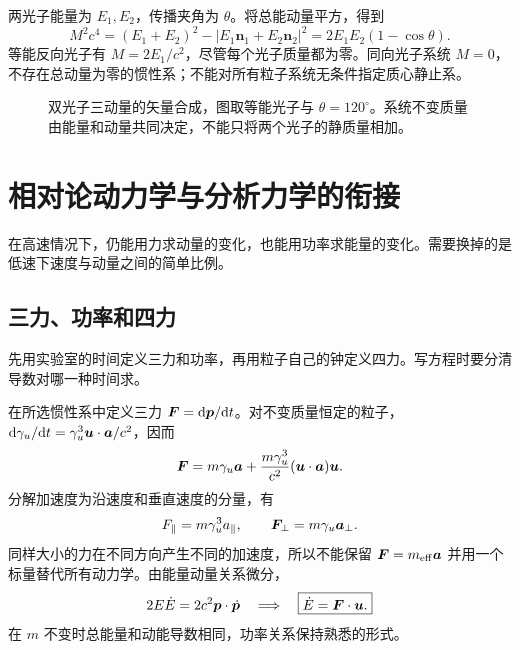 \begin{example}[两个无质量粒子组成有质量系统]
两光子能量为 $E_1,E_2$，传播夹角为 $\theta$。将总能动量平方，得到
\[
M^2c^4=(E_1+E_2)^2-|E_1\boldsymbol{n}_1+E_2\boldsymbol{n}_2|^2
=2E_1E_2(1-\cos\theta).
\]
等能反向光子有 $M=2E_1/c^2$，尽管每个光子质量都为零。同向光子系统 $M=0$，不存在总动量为零的惯性系；不能对所有粒子系统无条件指定质心静止系。
\end{example}

\begin{figure}[htbp]\centering
{}
\caption{双光子三动量的矢量合成，图取等能光子与 $\theta=120^\circ$。系统不变质量由能量和动量共同决定，不能只将两个光子的静质量相加。}\label{fig:sr-photons}
\end{figure}

\section{相对论动力学与分析力学的衔接}
在高速情况下，仍能用力求动量的变化，也能用功率求能量的变化。需要换掉的是低速下速度与动量之间的简单比例。

\subsection{三力、功率和四力}
先用实验室的时间定义三力和功率，再用粒子自己的钟定义四力。写方程时要分清导数对哪一种时间求。

在所选惯性系中定义三力 $\boldsymbol{F}=\mathrm{d}\boldsymbol{p}/\mathrm{d} t$。对不变质量恒定的粒子，$\mathrm{d}\gamma_u/\mathrm{d} t=\gamma_u^3\boldsymbol{u}\cdot\boldsymbol{a}/c^2$，因而
\begin{equation}\label{eq:sr-force}
\boldsymbol{F}=m\gamma_u\boldsymbol{a}+\frac{m\gamma_u^3}{c^2}(\boldsymbol{u}\cdot\boldsymbol{a})\boldsymbol{u}.
\end{equation}
分解加速度为沿速度和垂直速度的分量，有
\[
F_\parallel=m\gamma_u^3a_\parallel,\qquad
\boldsymbol{F}_\perp=m\gamma_u\boldsymbol{a}_\perp.
\]
同样大小的力在不同方向产生不同的加速度，所以不能保留 $\boldsymbol{F}=m_{\rm eff}\boldsymbol{a}$ 并用一个标量替代所有动力学。由能量动量关系微分，
\[
2E\dot E=2c^2\boldsymbol{p}\cdot\dot{\boldsymbol{p}}
\quad\Longrightarrow\quad\boxed{\dot E=\boldsymbol{F}\cdot\boldsymbol{u}.}
\]
在 $m$ 不变时总能量和动能导数相同，功率关系保持熟悉的形式。

